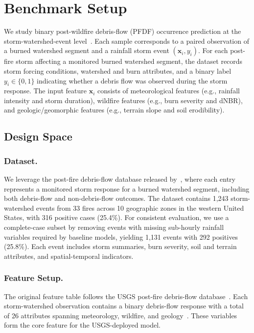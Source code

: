 \section{Benchmark Setup}\label{sec-benchmark}
We study binary post-wildfire debris-flow (PFDF) occurrence prediction at the storm-watershed-event level~\cite{staley2016}. Each sample corresponds to a paired observation of a burned watershed segment and a rainfall storm event ${(\mathbf{x}_i, y_i)}$. For each post-fire storm affecting a monitored burned watershed segment, the dataset records storm forcing conditions, watershed and burn attributes, and a binary label $y_i \in \{0,1\}$ indicating whether a debris flow was observed during the storm response. The input feature $\mathbf{x}_i$ consists of meteorological features
(e.g., rainfall intensity and storm duration), wildfire features (e.g., burn severity and dNBR), and geologic/geomorphic
features (e.g., terrain slope and soil erodibility).

\subsection{Design Space} 

\subsubsection{Dataset.} We leverage the post-fire debris-flow database released by~\cite{staley2016}, where each entry represents a monitored storm response for a burned watershed segment, including both debris-flow and non-debris-flow outcomes. The dataset contains 1,243 storm-watershed events from 33 fires across 10 geographic zones in the western United States, with 316 positive cases (25.4\%).
%
For consistent evaluation, we use a complete-case subset by removing events with missing sub-hourly rainfall variables required by baseline models, yielding 1,131 events with 292 positives (25.8\%). Each event includes storm summaries, burn severity, soil and terrain attributes, and spatial-temporal indicators.

\subsubsection{Feature Setup.}
The original feature table follows the USGS post-fire debris-flow database~\cite{staley2016}. Each storm-watershed observation contains a binary debris-flow response with a total of 26 attributes spanning meteorology, wildfire, and geology~\cite{staley2016updated, gartner2014empirical}. 
These variables form the core feature for the USGS-deployed model.

